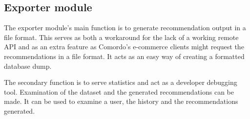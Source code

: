 
\subsection{Exporter module}

The exporter module's main function is to generate recommendation output in a file format. This serves as both a workaround for the lack of a working remote API and as an extra feature as Comordo's e-commerce clients might request the recommendations in a file format. It acts as an easy way of creating a formatted database dump.

The secondary function is to serve statistics and act as a developer debugging tool. Examination of the dataset and the generated recommendations can be made. It can be used to examine a user, the history and the recommendations generated.

